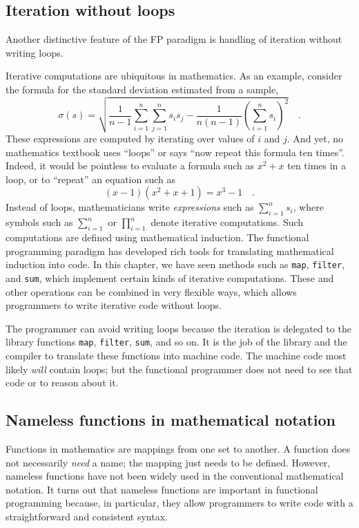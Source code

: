 \subsection{Iteration without loops}

Another distinctive feature of the FP paradigm is handling of iteration
without writing loops.

Iterative computations are ubiquitous in mathematics. As an example,
consider the formula for the standard deviation estimated from a sample,
\[
\sigma(s)=\sqrt{\frac{1}{n-1}\sum_{i=1}^{n}\sum_{j=1}^{n}s_{i}s_{j}-\frac{1}{n\left(n-1\right)}\left(\sum_{i=1}^{n}s_{i}\right)^{2}}\quad.
\]
These expressions are computed by iterating over values of $i$ and
$j$. And yet, no mathematics textbook uses \textsf{``}loops\textsf{''} or says \textsf{``}now
repeat this formula ten times\textsf{''}. Indeed, it would be pointless to
evaluate a formula such as $x^{2}+x$ ten times in a loop, or to \textsf{``}repeat\textsf{''}
an equation such as
\[
\left(x-1\right)(x^{2}+x+1)=x^{3}-1\quad.
\]
Instead of loops, mathematicians write \emph{expressions} such as
$\sum_{i=1}^{n}s_{i}$, where symbols such as $\sum_{i=1}^{n}$ or
$\prod_{i=1}^{n}$ denote iterative computations. Such computations
are defined using mathematical induction.
The functional programming paradigm has developed rich tools for translating
mathematical induction into code. In this chapter, we have seen methods
such as \lstinline!map!, \lstinline!filter!, and \lstinline!sum!,
which implement certain kinds of iterative computations. These and
other operations can be combined in very flexible ways, which allows
programmers to write iterative code without loops.

The programmer can avoid writing loops because the iteration is delegated
to the library functions \lstinline!map!, \lstinline!filter!, \lstinline!sum!,
and so on. It is the job of the library and the compiler to translate
these functions into machine code. The machine code most likely \emph{will}
contain loops; but the functional programmer does not need to see
that code or to reason about it.

\subsection{Nameless functions in mathematical notation\label{subsec:Nameless-functions-in-mathematical-notation}}

Functions in mathematics are mappings from one set to another. A function
does not necessarily \emph{need} a name; the mapping just needs to
be defined. However, nameless functions have not been widely used
in the conventional mathematical notation. It turns out that nameless
functions are important in functional programming because, in particular,
they allow programmers to write code with a straightforward and consistent
syntax.

